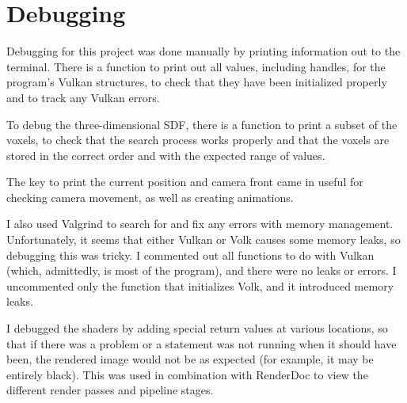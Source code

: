 \section{Debugging}

Debugging for this project was done manually by printing information out to the terminal. There is a function to print out all values, including handles, for the program's Vulkan structures, to check that they have been initialized properly and to track any Vulkan errors.\newline

To debug the three-dimensional SDF, there is a function to print a subset of the voxels, to check that the search process works properly and that the voxels are stored in the correct order and with the expected range of values.\newline

The key to print the current position and camera front came in useful for checking camera movement, as well as creating animations.\newline

I also used Valgrind to search for and fix any errors with memory management. Unfortunately, it seems that either Vulkan or Volk causes some memory leaks, so debugging this was tricky. I commented out all functions to do with Vulkan (which, admittedly, is most of the program), and there were no leaks or errors. I uncommented only the function that initializes Volk, and it introduced memory leaks.\newline

I debugged the shaders by adding special return values at various locations, so that if there was a problem or a statement was not running when it should have been, the rendered image would not be as expected (for example, it may be entirely black). This was used in combination with RenderDoc to view the different render passes and pipeline stages.
